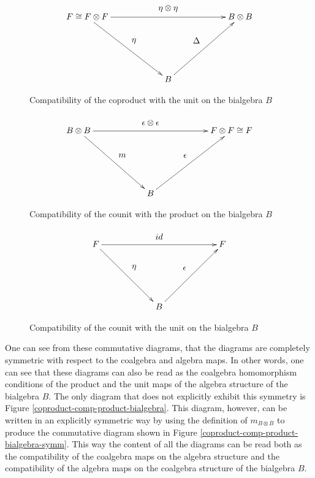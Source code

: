 \begin{figure}[!h]
  \[
  \xymatrix@=60pt{
    F \cong F \otimes F \ar[dr]^-*+{\eta} \ar[rr]^-*+{\eta \otimes \eta} &                       & B \otimes B\\
                                                                         & B \ar[ur]^-*+{\Delta} &            \\
  }
  \]
  \caption{Compatibility of the coproduct with the unit on the bialgebra $B$}
  \label{coproduct-comp-unit-bialgebra}
\end{figure}


\begin{figure}[!h]
  \[
  \xymatrix@=60pt{
    B \otimes B \ar[dr]^-*+{m} \ar[rr]^-*+{\epsilon \otimes \epsilon} &                         & F \otimes F \cong F \\
                                                                      & B \ar[ur]^-*+{\epsilon} &                     \\
  }
  \]
  \caption{Compatibility of the counit with the product on the bialgebra $B$}
  \label{counit-comp-product-bialgebra}
\end{figure}


\begin{figure}[!h]
  \[
  \xymatrix@=60pt{
    F \ar[dr]^-*+{\eta} \ar[rr]^-*+{id} &                         & F  \\
                                        & B \ar[ur]^-*+{\epsilon} & \\
  }
  \]
  \caption{Compatibility of the counit with the unit on the bialgebra $B$}
  \label{counit-comp-unit-bialgebra}
\end{figure}
\pagebreak
One can see from these commutative diagrams, that the diagrams are completely symmetric with
respect to the coalgebra and algebra maps. In other words, one can see that these diagrams
can also be read as the coalgebra homomorphism conditions of the product and the unit maps
of the algebra structure of the bialgebra $B$. The only diagram that does not explicitly exhibit
this symmetry is Figure \ref{coproduct-comp-product-bialgebra}. This diagram, however, can be
written in an explicitly symmetric way by using the definition of $m_{B\otimes B}$ to produce the
commutative diagram shown in Figure \ref{coproduct-comp-product-bialgebra-symm}. This way
the content of all the diagrams can be read both as the compatibility of the coalgebra maps
on the algebra structure and the compatibility of the algebra maps on the coalgebra structure of
the bialgebra $B$.


